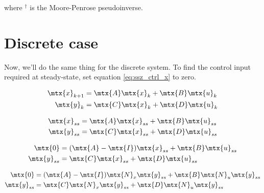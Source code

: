 where $^\dagger$ is the Moore-Penrose pseudoinverse.

\section{Discrete case}

Now, we'll do the same thing for the discrete \gls{system}. To find the
\gls{control input} required at steady-state, set equation \eqref{eq:ssz_ctrl_x}
to zero.

\begin{align*}
  \mtx{x}_{k+1} &= \mtx{A}\mtx{x}_k + \mtx{B}\mtx{u}_k \\
  \mtx{y}_k &= \mtx{C}\mtx{x}_k + \mtx{D}\mtx{u}_k
\end{align*}

\begin{align*}
  \mtx{x}_{ss} &= \mtx{A}\mtx{x}_{ss} + \mtx{B}\mtx{u}_{ss} \\
  \mtx{y}_{ss} &= \mtx{C}\mtx{x}_{ss} + \mtx{D}\mtx{u}_{ss}
\end{align*}

\begin{align*}
  \mtx{0} &= (\mtx{A} - \mtx{I})\mtx{x}_{ss} + \mtx{B}\mtx{u}_{ss} \\
  \mtx{y}_{ss} &= \mtx{C}\mtx{x}_{ss} + \mtx{D}\mtx{u}_{ss}
\end{align*}

\begin{align*}
  \mtx{0} &= (\mtx{A} - \mtx{I})\mtx{N}_x\mtx{y}_{ss} +
    \mtx{B}\mtx{N}_u\mtx{y}_{ss} \\
  \mtx{y}_{ss} &= \mtx{C}\mtx{N}_x\mtx{y}_{ss} + \mtx{D}\mtx{N}_u\mtx{y}_{ss}
\end{align*}

